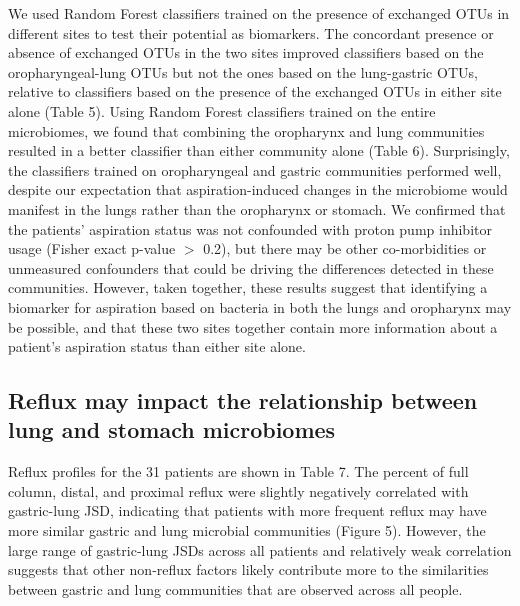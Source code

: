 \documentclass{article}
\begin{document}
We used Random Forest classifiers trained on the presence of exchanged OTUs in different sites to test their potential as biomarkers.
The concordant presence or absence of exchanged OTUs in the two sites improved classifiers based on the oropharyngeal-lung OTUs but not the ones based on the lung-gastric OTUs, relative to classifiers based on the presence of the exchanged OTUs in either site alone (Table 5).
Using Random Forest classifiers trained on the entire microbiomes, we found that combining the oropharynx and lung communities resulted in a better classifier than either community alone (Table 6).
Surprisingly, the classifiers trained on oropharyngeal and gastric communities performed well, despite our expectation that aspiration-induced changes in the microbiome would manifest in the lungs rather than the oropharynx or stomach.
We confirmed that the patients' aspiration status was not confounded with proton pump inhibitor usage (Fisher exact p-value $>$ 0.2), but there may be other co-morbidities or unmeasured confounders that could be driving the differences detected in these communities.
However, taken together, these results suggest that identifying a biomarker for aspiration based on bacteria in both the lungs and oropharynx may be possible, and that these two sites together contain more information about a patient’s aspiration status than either site alone.

\FloatBarrier

\subsection{Reflux may impact the relationship between lung and stomach microbiomes}

Reflux profiles for the 31 patients are shown in Table 7. 
The percent of full column, distal, and proximal reflux were slightly negatively correlated with gastric-lung JSD, indicating that patients with more frequent reflux may have more similar gastric and lung microbial communities (Figure 5).
However, the large range of gastric-lung JSDs across all patients and relatively weak correlation suggests that other non-reflux factors likely contribute more to the similarities between gastric and lung communities that are observed across all people.

\end{document}
